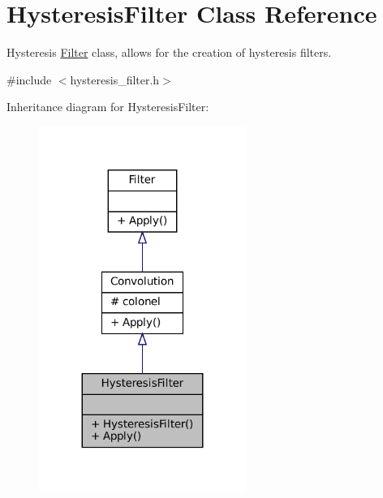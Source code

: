 \hypertarget{classHysteresisFilter}{}\section{Hysteresis\+Filter Class Reference}
\label{classHysteresisFilter}


Hysteresis \hyperlink{classFilter}{Filter} class, allows for the creation of hysteresis filters.  




{\ttfamily \#include $<$hysteresis\+\_\+filter.\+h$>$}



Inheritance diagram for Hysteresis\+Filter\+:
\nopagebreak
\begin{figure}[H]
\begin{center}
\leavevmode
\includegraphics[width=191pt]{classHysteresisFilter__inherit__graph}
\end{center}
\end{figure}


